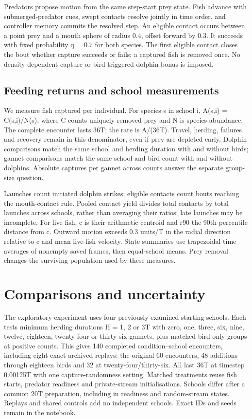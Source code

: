 \documentclass[10pt,a4paper,twocolumn]{article}
\begin{document}
Predators propose motion from the same step-start prey state. Fish advance with submerged-predator cues, swept contacts resolve jointly in time order, and controller memory commits the resolved step. An eligible contact occurs between a point prey and a mouth sphere of radius 0.4, offset forward by 0.3. It succeeds with fixed probability q = 0.7 for both species. The first eligible contact closes the bout whether capture succeeds or fails; a captured fish is removed once. No density-dependent capture or bird-triggered dolphin bonus is imposed.

\subsection{Feeding returns and school measurements}
We measure fish captured per individual. For species s in school i, A(s,i) = C(s,i)/N(s), where C counts uniquely removed prey and N is species abundance. The complete encounter lasts 36T; the rate is A/(36T). Travel, herding, failures and recovery remain in this denominator, even if prey are depleted early. Dolphin comparisons match the same school and herding duration with and without birds; gannet comparisons match the same school and bird count with and without dolphins. Absolute captures per gannet across counts answer the separate group-size question.

Launches count initiated dolphin strikes; eligible contacts count bouts reaching the mouth-contact rule. Pooled contact yield divides total contacts by total launches across schools, rather than averaging their ratios; late launches may be incomplete. For live fish, c is their arithmetic centroid and r90 the 90th percentile distance from c. Outward motion exceeds 0.3 units/T in the radial direction relative to c and mean live-fish velocity. State summaries use trapezoidal time averages of nonempty saved frames, then equal-school means. Prey removal changes the surviving population used by these measures.

\section{Comparisons and uncertainty}
The exploratory experiment uses four previously examined starting schools. Each tests minimum herding durations H = 1, 2 or 3T with zero, one, three, six, nine, twelve, eighteen, twenty-four or thirty-six gannets, plus matched bird-only groups at positive counts. This gives 140 completed condition--school encounters, including eight exact archived replays: the original 60 encounters, 48 additions through eighteen birds and 32 at twenty-four/thirty-six. All last 36T at timestep 0.00125T with one capture-randomness setting. Matched treatments reuse fish starts, predator readiness and private-stream initialisations. Schools differ after a common 20T preparation, including in readiness and random-stream states. Replays and shared controls add no independent schools. Exact IDs and seeds remain in the notebook.
\end{document}
